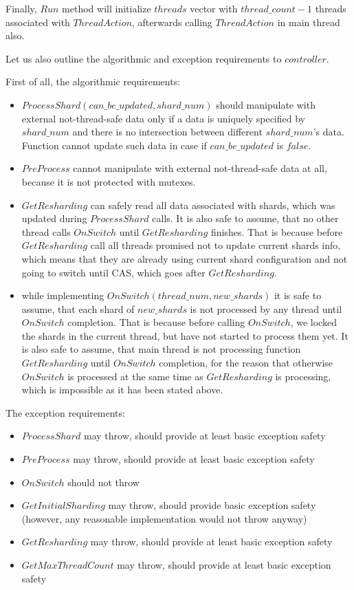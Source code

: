 \documentclass{article}
\begin{document}
Finally, $Run$ method will initialize $threads$ vector with $thread\_count - 1$ threads associated with $ThreadAction$, afterwards calling $ThreadAction$ in main thread also.

Let us also outline the algorithmic and exception requirements to $controller$.

First of all, the algorithmic requirements:
\begin{itemize}
	\item $ProcessShard(can\_be\_updated, shard\_num)$ should manipulate with external not-thread-safe data only if a data is uniquely specified by $shard\_num$ and there is no intersection between different $shard\_num$'s data. Function cannot update such data in case if $can\_be\_updated$ is $false$.
	\item $PreProcess$ cannot manipulate with external not-thread-safe data at all, because it is not protected with mutexes.
	\item $GetResharding$ can safely read all data associated with shards, which was updated during $ProcessShard$ calls. It is also safe to assume, that no other thread calls $OnSwitch$ until $GetResharding$ finishes. That is because before $GetResharding$ call all threads promised not to update current shards info, which means that they are already using current shard configuration and not going to switch until CAS, which goes after $GetResharding$.
	\item while implementing $OnSwitch(thread\_num, new\_shards)$ it is safe to assume, that each shard of $new\_shards$ is not processed by any thread until $OnSwitch$ completion. That is because before calling $OnSwitch$, we locked the shards in the current thread, but have not started to process them yet. It is also safe to assume, that main thread is not processing function $GetResharding$ until $OnSwitch$ completion, for the reason that otherwise $OnSwitch$ is processed at the same time as $GetResharding$ is processing, which is impossible as it has been stated above.
\end{itemize}

The exception requirements:
\begin{itemize}
	\item $ProcessShard$ may throw, should provide at least basic exception safety
	\item $PreProcess$ may throw, should provide at least basic exception safety
	\item $OnSwitch$ should not throw
	\item $GetInitialSharding$ may throw, should provide basic exception safety (however, any reasonable implementation would not throw anyway)
	\item $GetResharding$ may throw, should provide at least basic exception safety
	\item $GetMaxThreadCount$ may throw, should provide at least basic exception safety
\end{itemize}
\end{document}
